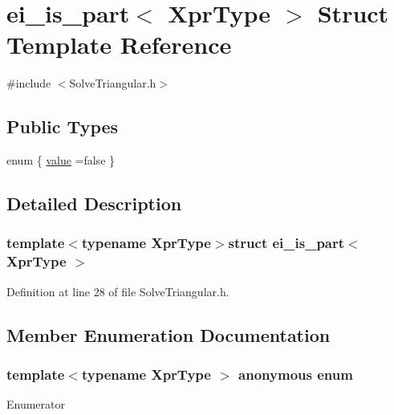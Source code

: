 \hypertarget{structei__is__part}{\section{ei\-\_\-is\-\_\-part$<$ Xpr\-Type $>$ Struct Template Reference}
\label{structei__is__part}
}


{\ttfamily \#include $<$Solve\-Triangular.\-h$>$}

\subsection*{Public Types}
\begin{DoxyCompactItemize}
\item 
enum \{ \hyperlink{structei__is__part_a989eb418c6d3e30ace67fe1f12323ef5a944d1fbc24449d38245bba3103fc1607}{value} =false
 \}
\end{DoxyCompactItemize}


\subsection{Detailed Description}
\subsubsection*{template$<$typename Xpr\-Type$>$struct ei\-\_\-is\-\_\-part$<$ Xpr\-Type $>$}



Definition at line 28 of file Solve\-Triangular.\-h.



\subsection{Member Enumeration Documentation}
\hypertarget{structei__is__part_a989eb418c6d3e30ace67fe1f12323ef5}{\subsubsection[{anonymous enum}]{\setlength{\rightskip}{0pt plus 5cm}template$<$typename Xpr\-Type $>$ anonymous enum}}\label{structei__is__part_a989eb418c6d3e30ace67fe1f12323ef5}
\begin{Desc}
\item[Enumerator]\par
\begin{description}
\item[{\em 
\hypertarget{structei__is__part_a989eb418c6d3e30ace67fe1f12323ef5a944d1fbc24449d38245bba3103fc1607}{value}\label{structei__is__part_a989eb418c6d3e30ace67fe1f12323ef5a944d1fbc24449d38245bba3103fc1607}
}]\end{description}
\end{Desc}


